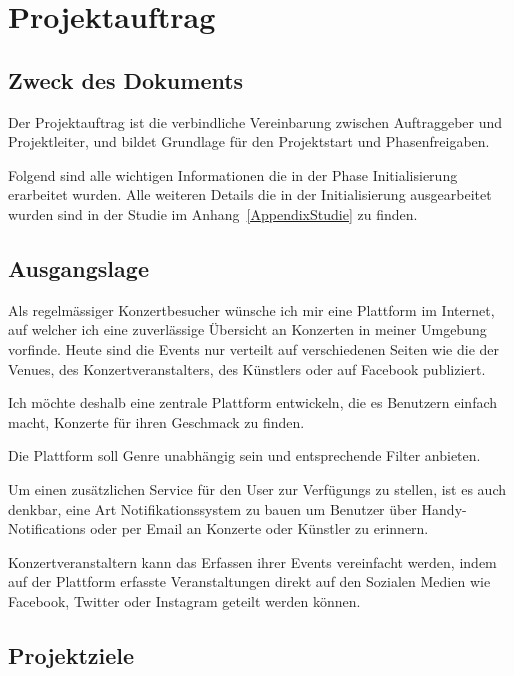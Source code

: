 \chapter{Projektauftrag}

\label{AppendixProjektauftrag}

\section{Zweck des Dokuments}\label{ProjektauftragZweck}

Der Projektauftrag ist die verbindliche Vereinbarung zwischen Auftraggeber und
Projektleiter, und bildet Grundlage für den Projektstart und Phasenfreigaben.

Folgend sind alle wichtigen Informationen die in der Phase Initialisierung
erarbeitet wurden. Alle weiteren Details die in der Initialisierung
ausgearbeitet wurden sind in der Studie im Anhang~\ref{AppendixStudie} zu
finden.

\section{Ausgangslage}\label{ausgangslage}

Als regelmässiger Konzertbesucher wünsche ich mir eine Plattform im
Internet, auf welcher ich eine zuverlässige Übersicht an Konzerten in
meiner Umgebung vorfinde. Heute sind die Events nur verteilt auf
verschiedenen Seiten wie die der Venues, des Konzertveranstalters, des
Künstlers oder auf Facebook publiziert.

Ich möchte deshalb eine zentrale Plattform entwickeln, die es Benutzern
einfach macht, Konzerte für ihren Geschmack zu finden.

Die Plattform soll Genre unabhängig sein und entsprechende Filter
anbieten.

Um einen zusätzlichen Service für den User zur Verfügungs zu stellen,
ist es auch denkbar, eine Art Notifikationssystem zu bauen um Benutzer
über Handy-Notifications oder per Email an Konzerte oder Künstler zu
erinnern.

Konzertveranstaltern kann das Erfassen ihrer Events vereinfacht werden,
indem auf der Plattform erfasste Veranstaltungen direkt auf den Sozialen
Medien wie Facebook, Twitter oder Instagram geteilt werden können.

\clearpage
\section{Projektziele}\label{projektziele}

